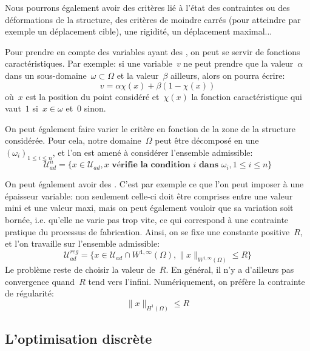 Nous pourrons également avoir des critères lié à l'état des contraintes ou des déformations de la structure, des critères de moindre carrés (pour atteindre par exemple un déplacement cible), une rigidité, un déplacement maximal...

\medskip
Pour prendre en compte des variables ayant des , on peut se servir de fonctions caractéristiques.
Par  exemple: si une variable~$v$ ne peut prendre que la valeur~$\alpha$ dans un sous-domaine~$\omega\subset\Omega$ et la valeur~$\beta$ ailleurs, alors on pourra écrire:
\begin{equation}
v = \alpha \chi(x) + \beta(1-\chi(x))
\end{equation}
où~$x$ est la position du point considéré et~$\chi(x)$ la fonction caractéristique qui vaut~$1$ si~$x\in\omega$ et~$0$ sinon.

\medskip
On peut également faire varier le critère en fonction de la zone de la structure considérée.
Pour cela, notre domaine~$\Omega$ peut être décomposé en une ~$(\omega_i)_{1\le i\le n}$, et l'on est amené à considérer l'ensemble admissible:
\begin{equation}
\mathcal{U}^n_{ad}=\{ x\in \mathcal{U}_{ad}, x \textbf{ vérifie la condition } i \textbf{ dans } \omega_i, 1\le i\le n\}
\end{equation}

\medskip
On peut également avoir des . C'est par exemple ce que l'on peut imposer à une épaisseur variable: non seulement celle-ci doit être comprises entre une valeur mini et une valeur maxi, mais on peut également vouloir que sa variation soit bornée, i.e. qu'elle ne varie pas trop vite, ce qui correspond à une contrainte pratique du processus de fabrication.
Ainsi, on se fixe une constante positive~$R$, et l'on travaille sur l'ensemble admissible:
\begin{equation}
\mathcal{U}^{reg}_{ad}=\{ x\in \mathcal{U}_{ad} \cap W^{1,\infty}(\Omega), \|x\|_{W^{1,\infty}(\Omega)}\le R\}
\end{equation}
Le problème reste de choisir la valeur de~$R$. En général, il n'y a d'ailleurs pas convergence quand~$R$ tend vers l'infini.
Numériquement, on préfère la contrainte de régularité:
\begin{equation}
\|x\|_{H^1(\Omega)}\le R
\end{equation}

\medskip
\subsection{L'optimisation discrète}\label{Sec-OptDisc}

